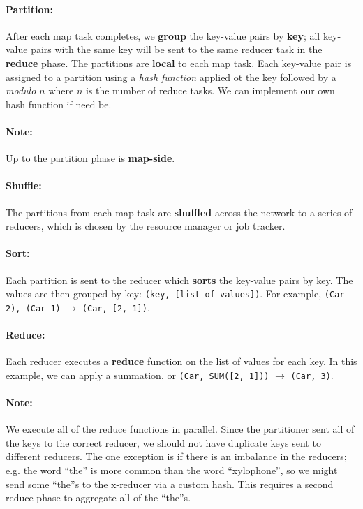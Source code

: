 \documentclass{report}
\renewcommand{\bf}[1]{\textbf{{#1}}}
\renewcommand{\tt}[1]{\texttt{{#1}}}
\renewcommand{\it}[1]{\textit{{#1}}}
\begin{document}
\paragraph{Partition:}
After each map task completes, we \bf{group} the key-value pairs by \bf{key};
all key-value pairs with the same key will be sent to the same reducer task in
the \bf{reduce} phase. The partitions are \bf{local} to each map task. Each
key-value pair is assigned to a partition using a \it{hash function} applied ot
the key followed by a \it{modulo $n$} where $n$ is the number of reduce tasks.
We can implement our own hash function if need be.

\paragraph{Note:} Up to the partition phase is \bf{map-side}.

\paragraph{Shuffle:}
The partitions from each map task are \bf{shuffled} across the network to a
series of reducers, which is chosen by the resource manager or job tracker.

\paragraph{Sort:}
Each partition is sent to the reducer which \bf{sorts} the key-value pairs by
key. The values are then grouped by key: \tt{(key, [list of values])}. For
example, \tt{(Car 2), (Car 1)} $\to$ \tt{(Car, [2, 1])}.

\paragraph{Reduce:}
Each reducer executes a \bf{reduce} function on the list of values for each key.
In this example, we can apply a summation, or \tt{(Car, SUM([2, 1]))} $\to$
\tt{(Car, 3)}.

\paragraph{Note:} We execute all of the reduce functions in parallel. Since the
partitioner sent all of the keys to the correct reducer, we should not have
duplicate keys sent to different reducers. The one exception is if there is an
imbalance in the reducers; e.g. the word ``the'' is more common than the word
``xylophone'', so we might send some ``the''s to the x-reducer via a custom
hash. This requires a second reduce phase to aggregate all of the ``the''s.
\end{document}
